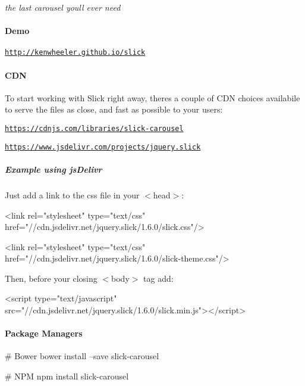 {\itshape the last carousel you\textquotesingle{}ll ever need}

\paragraph*{Demo}

\href{http://kenwheeler.github.io/slick/}{\tt http\+://kenwheeler.\+github.\+io/slick}

\paragraph*{C\+DN}

To start working with Slick right away, there\textquotesingle{}s a couple of C\+DN choices availabile to serve the files as close, and fast as possible to your users\+:


\begin{DoxyItemize}
\item \href{https://cdnjs.com/libraries/slick-carousel}{\tt https\+://cdnjs.\+com/libraries/slick-\/carousel}
\item \href{https://www.jsdelivr.com/projects/jquery.slick}{\tt https\+://www.\+jsdelivr.\+com/projects/jquery.\+slick}
\end{DoxyItemize}

\subparagraph*{Example using js\+Delivr}

Just add a link to the css file in your {\ttfamily $<$head$>$}\+: 
\begin{DoxyCode}
<link rel="stylesheet" type="text/css" href="//cdn.jsdelivr.net/jquery.slick/1.6.0/slick.css"/>

<link rel="stylesheet" type="text/css" href="//cdn.jsdelivr.net/jquery.slick/1.6.0/slick-theme.css"/>
\end{DoxyCode}


Then, before your closing {\ttfamily $<$body$>$} tag add\+:


\begin{DoxyCode}
<script type="text/javascript" src="//cdn.jsdelivr.net/jquery.slick/1.6.0/slick.min.js"></script>
\end{DoxyCode}


\paragraph*{Package Managers}


\begin{DoxyCode}
# Bower
bower install --save slick-carousel

# NPM
npm install slick-carousel
\end{DoxyCode}


